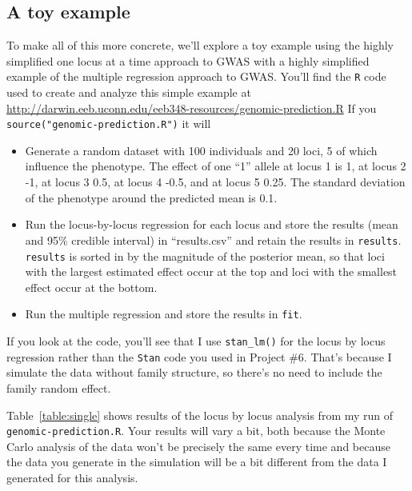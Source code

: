 \documentclass[12pt]{article}
\begin{document}
\subsection*{A toy example}

To make all of this more concrete, we'll explore a toy example using
the highly simplified one locus at a time approach to GWAS with a
highly simplified example of the multiple regression approach to
GWAS. You'll find the {\tt R} code used to create and analyze this
simple example at
\url{http://darwin.eeb.uconn.edu/eeb348-resources/genomic-prediction.R}
If you {\tt source("genomic-prediction.R")} it will

\begin{itemize}

\item Generate a random dataset with 100 individuals and 20 loci, 5 of
  which influence the phenotype. The effect of one ``1'' allele at
  locus 1 is 1, at locus 2 -1, at locus 3 0.5, at locus 4 -0.5, and at
  locus 5 0.25. The standard deviation of the phenotype around the
  predicted mean is 0.1.

\item Run the locus-by-locus regression for each locus and store the
  results (mean and 95\% credible interval) in ``results.csv'' and
  retain the results in {\tt results}. {\tt results} is sorted in by
  the magnitude of the posterior mean, so that loci with the largest
  estimated effect occur at the top and loci with the smallest effect
  occur at the bottom.

\item Run the multiple regression and store the results in {\tt fit}. 
    
\end{itemize}

If you look at the code, you'll see that I use {\tt stan\_lm()} for the
locus by locus regression rather than the {\tt Stan} code you used in
Project \#6. That's because I simulate the data without family
structure, so there's no need to include the family random effect.

Table~\ref{table:single} shows results of the locus by locus analysis
from my run of {\tt genomic-prediction.R}. Your results will vary a
bit, both because the Monte Carlo analysis of the data won't be
precisely the same every time and because the data you generate in the
simulation will be a bit different from the data I generated for this
analysis.
\end{document}
